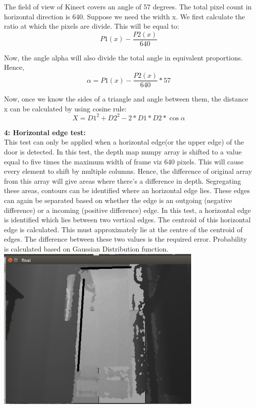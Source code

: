\documentclass{report}
\begin{document}
The field of view of Kinect covers an angle of 57 degrees. The total pixel count in horizontal direction is 640. 
Suppose we need the width x. We first calculate the ratio at which the pixels are divide. This will be equal to:
\begin{equation}
P1(x) - \frac{P2(x)}{640}
\end{equation}

Now, the angle alpha will also divide the total angle in equivalent proportions. Hence, 
\begin{equation}
\alpha = P1(x) - \frac{P2(x)} {640} * 57
\end{equation}

Now, once we know the sides of a triangle and angle between them, the distance x can be calculated by using cosine rule:
\begin{equation}
X = D1^2 + D2^2 - 2*D1*D2*\cos{\alpha}
\end{equation}
\pagebreak

\textbf{4: Horizontal edge test:} \\

This test can only be applied when a horizontal edge(or the upper edge) of the door is detected. 
In this test, the depth map numpy array is shifted to a value equal to five times the maximum width of 
frame viz 640 pixels. This will cause every element to shift by multiple columns. Hence, the difference of 
original array from this array will give areas where there's a difference in depth. Segregating these areas, 
contours can be identified where an horizontal edge lies. These edges can again be separated based on whether 
the edge is an outgoing (negative difference) or a incoming (positive difference) edge.
In this test, a horizontal edge is identified which lies between two vertical edges. The centroid of this 
horizontal edge is calculated. This must approximately lie at the centre of the centroid of edges. The 
difference between these two values is the required error. Probability is calculated based on Gaussian Distribution function. \\

\includegraphics[width = 10cm]{horizontal.png}
\end{document}

